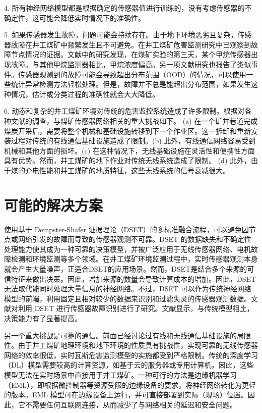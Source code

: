 \documentclass[lang=cn,a4paper,citestyle=gb7714-2015, bibstyle=gb7714-2015]{elegantpaper}
\newcommand{\mycite}[1]{\textsuperscript{\parencite{#1}}}
\begin{document}
    4. 所有神经网络模型都是根据确定的传感器值进行训练的，没有考虑传感器的不确定性，这可能会降低实时情况下的准确性。

    5. 如果传感器发生故障，问题可能会持续存在。由于地下环境恶劣且复杂，传感器故障在井工煤矿中频繁发生且不可避免。在井工煤矿危害监测研究中已观察到故障节点情况的证据。文献\mycite{Schatzel2017}中的研究发现，在煤矿实验的第三天，某个甲烷传感器出现故障。与其他甲烷监测器相比，甲烷浓度偏高。另一项文献研究\mycite{Krog2006}也报告了类似事件。传感器观测到的故障可能会导致超出分布范围（OOD）的情况，可以使用一些统计异常检测方法轻松处理。但是，故障并不总是能超出分布范围，如果发生这种情况，估计或分类过程的准确性就会大大降低。

    6. 动态和复杂的井工煤矿环境对传统的危害监控系统造成了许多限制。根据对各种文献的调查，与煤矿传感器网络相关的重大挑战如下。 (a) 在一个矿井巷道完成煤炭开采后，需要将整个机械和基础设施转移到下一个作业区。这一拆卸和重新安装过程对传统的有线通信基础设施造成了限制。(b) 此外，有线通信网络容易受到机械和其他方面的损坏。(c) 在这种情况下，无线基础设施在灵活性和便携性方面具有优势。然而，井工煤矿的地下作业对传统无线系统造成了限制。 (d) 此外，由于煤的介电性能和井工煤矿的地质特征，这些无线系统的信号衰减很大。

    \section{可能的解决方案}
    使用基于 Dempster-Shafer 证据理论（DSET）的多标准融合流程，可以避免因节点或网络引发的故障而导致的传感器观测不可靠。DSET 的数据缺失和不确定性处理能力\mycite{ref8}使其成为一种可靠的决策模型\mycite{Fontani2013}，并被广泛应用于无线传感器网络、电机故障检测和环境监测等多个领域\mycite{Ahmed2012}\mycite{ref35}\mycite{Maseleno2012}\mycite{Nesa2017}。在井工煤矿环境监测过程中，实时传感器观测本身就会产生大量噪声，正适合DSET的应用场景。然而，DSET是结合多个来源的可信特征来做出决策。因此，增加来源的数量会导致计算成本的增加。因此，DSET 无法取代能同时处理大量信息的神经网络。不过，DSET 可以作为传统神经网络模型的前端，利用固定且相对较少的数据来识别和过滤失灵的传感器观测数据。文献\mycite{Ghosh2020}对利用 DSET 进行传感器故障识别进行了研究。文献显示，与传统模型相比，决策能力有了显著提高。

    另一个重大挑战是可靠的通信。前面已经讨论过有线和无线通信基础设施的局限性。由于井工煤矿地理环境和地下环境的性质具有挑战性，实现可靠的无线传感器网络的效率很低，实时瓦斯危害监测模型的实施都受到严格限制。传统的深度学习（DL）模型需要较高的计算资源，如基于云的服务器或专用计算机。因此，这些模型无法在实时场景中直接用于井工煤矿。一种可行的方法是边缘机器学习（EML），即根据微控制器等资源受限的边缘设备的要求，将神经网络转化为更轻的版本\mycite{Merenda2020}。EML 模型可在边缘设备上运行，并可直接部署到实际（现场）位置。因此，它不需要任何互联网连接，从而减少了与网络相关的延迟和安全问题。
\end{document}

